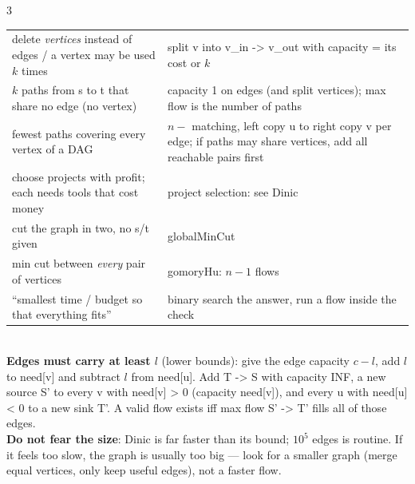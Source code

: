 \documentclass[9pt,a4paper]{extarticle}
\makeatletter
\newcommand{\code}[1]{{\ttfamily\small #1}}
\newenvironment{ctab}[2]{%
  \begingroup\setlength{\tabcolsep}{3pt}%
  \begin{tabular}{@{}p{#1\columnwidth}p{#2\columnwidth}@{}}}%
  {\end{tabular}\endgroup}
\makeatother
\begin{document}
\begin{multicols*}{3}
{{\begin{ctab}{0.47}{0.48}
delete \emph{vertices} instead of edges / a vertex may be used $k$ times & split
\code{v} into \code{v\_in -> v\_out} with capacity = its cost or $k$\\
$k$ paths from \code{s} to \code{t} that share no edge (no vertex) & capacity 1 on edges
(and split vertices); max flow is the number of paths\\
fewest paths covering every vertex of a DAG & $n -$ matching, left copy \code{u} to
right copy \code{v} per edge; if paths may share vertices, add all reachable pairs
first\\
choose projects with profit; each needs tools that cost money & project selection: see
\code{Dinic}\\
cut the graph in two, no \code{s}/\code{t} given & \code{globalMinCut}\\
min cut between \emph{every} pair of vertices & \code{gomoryHu}: $n-1$ flows\\
``smallest time / budget so that everything fits'' & binary search the answer, run a
flow inside the check\\
\end{ctab}}\\[0.3ex]
\textbf{Edges must carry at least $l$} (lower bounds): give the edge capacity $c - l$,
add $l$ to \code{need[v]} and subtract $l$ from \code{need[u]}. Add \code{T -> S} with
capacity \code{INF}, a new source \code{S'} to every \code{v} with \code{need[v] > 0}
(capacity \code{need[v]}), and every \code{u} with \code{need[u] < 0} to a new sink
\code{T'}. A valid flow exists iff max flow \code{S' -> T'} fills all of those
edges.\\[0.3ex]
\textbf{Do not fear the size}: Dinic is far faster than its bound; $10^5$ edges is
routine. If it feels too slow, the graph is usually too big --- look for a smaller
graph (merge equal vertices, only keep useful edges), not a faster flow.}


\end{multicols*}
\end{document}
